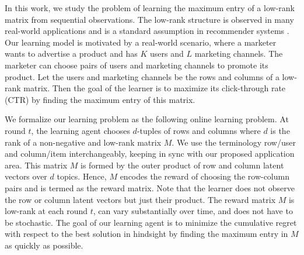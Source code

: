 In this work, we study the problem of learning the maximum entry of a low-rank matrix from sequential observations. The low-rank structure is observed in many real-world applications and is a standard assumption in recommender systems \citep{koren2009matrix,ricci2011liorrokach}. Our learning model is motivated by a real-world scenario, where a marketer wants to advertise a product and has $K$ users and $L$ marketing channels. The marketer can choose pairs of users and marketing channels to promote its product. Let the users and marketing channels be the rows and columns of a low-rank matrix. Then the goal of the learner is to maximize its click-through rate (CTR) by finding the maximum entry of this matrix. 




We formalize our learning problem as the following online learning problem. At round $t$, the learning agent chooses $d$-tuples of rows and columns where $d$ is the rank of a non-negative and low-rank matrix $M$. We use the terminology row/user and column/item interchangeably, keeping in sync with our proposed application area. This matrix $M$ is formed by the outer product of row and column latent vectors over $d$ topics. Hence, $M$ encodes the reward of choosing the row-column pairs and is termed as the reward matrix. Note that the learner does not observe the row or column  latent vectors  but just their product. The reward matrix $M$ is low-rank at each round $t$, can vary substantially over time, and does not have to be stochastic.  The goal of our learning agent is to minimize the cumulative regret with respect to the best solution in hindsight by finding the maximum entry in $M$ as quickly as possible.

